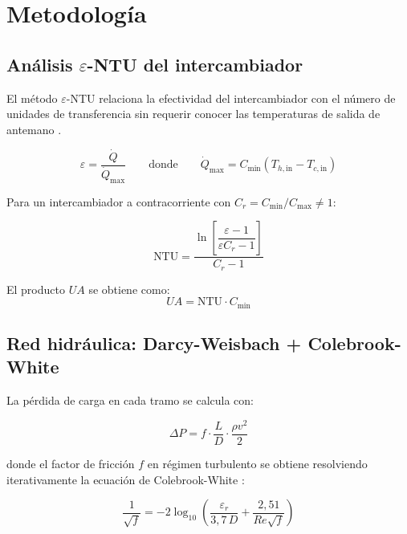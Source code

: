 \documentclass[12pt, letterpaper]{article}
\begin{document}
\section{Metodología}

\subsection{Análisis \texorpdfstring{$\varepsilon$}{ε}-NTU del intercambiador}

El método $\varepsilon$-NTU relaciona la efectividad del intercambiador con el
número de unidades de transferencia sin requerir conocer las temperaturas de salida
de antemano \cite{incropera2011}.

\begin{equation}
  \varepsilon = \frac{\dot{Q}}{\dot{Q}_\text{max}}
  \qquad \text{donde} \qquad
  \dot{Q}_\text{max} = C_\text{min}(T_{h,\text{in}} - T_{c,\text{in}})
  \label{eq:efectividad}
\end{equation}

Para un intercambiador a contracorriente con $C_r = C_\text{min}/C_\text{max} \neq 1$:

\begin{equation}
  \text{NTU} = \frac{\ln\!\left[\dfrac{\varepsilon - 1}{\varepsilon C_r - 1}\right]}{C_r - 1}
  \label{eq:NTU_contracorriente}
\end{equation}

El producto $UA$ se obtiene como:
\begin{equation}
  UA = \text{NTU} \cdot C_\text{min}
  \label{eq:UA}
\end{equation}

\subsection{Red hidráulica: Darcy-Weisbach + Colebrook-White}

La pérdida de carga en cada tramo se calcula con:

\begin{equation}
  \Delta P = f \cdot \frac{L}{D} \cdot \frac{\rho v^2}{2}
  \label{eq:darcy_weisbach}
\end{equation}

donde el factor de fricción $f$ en régimen turbulento se obtiene resolviendo
iterativamente la ecuación de Colebrook-White \cite{white2011}:

\begin{equation}
  \frac{1}{\sqrt{f}} = -2\log_{10}\!\left(\frac{\varepsilon_r}{3{,}7\,D} +
  \frac{2{,}51}{Re\sqrt{f}}\right)
  \label{eq:colebrook}
\end{equation}
\end{document}
